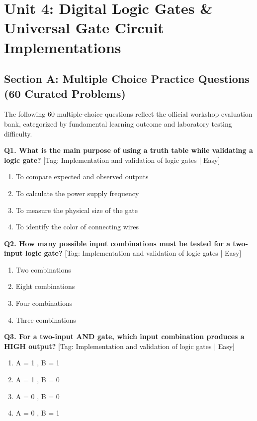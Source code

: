 \chapter{Unit 4: Digital Logic Gates \& Universal Gate Circuit Implementations}

\section{Section A: Multiple Choice Practice Questions (60 Curated Problems)}

\noindent The following 60 multiple-choice questions reflect the official workshop evaluation bank, categorized by fundamental learning outcome and laboratory testing difficulty.\vspace{3mm}

\noindent\textbf{Q1. What is the main purpose of using a truth table while validating a logic gate?} \hfill [Tag: Implementation and validation of logic gates | Easy]
\begin{enumerate}[label=(\alph*),topsep=2pt,itemsep=1pt,partopsep=0pt,parsep=0pt]
    \item {To compare expected and observed outputs}
    \item {To calculate the power supply frequency}
    \item {To measure the physical size of the gate}
    \item {To identify the color of connecting wires}
\end{enumerate}
\vspace{2mm}

\noindent\textbf{Q2. How many possible input combinations must be tested for a two-input logic gate?} \hfill [Tag: Implementation and validation of logic gates | Easy]
\begin{enumerate}[label=(\alph*),topsep=2pt,itemsep=1pt,partopsep=0pt,parsep=0pt]
    \item {Two combinations}
    \item {Eight combinations}
    \item {Four combinations}
    \item {Three combinations}
\end{enumerate}
\vspace{2mm}

\noindent\textbf{Q3. For a two-input AND gate, which input combination produces a HIGH output?} \hfill [Tag: Implementation and validation of logic gates | Easy]
\begin{enumerate}[label=(\alph*),topsep=2pt,itemsep=1pt,partopsep=0pt,parsep=0pt]
    \item {A = 1 , B = 1}
    \item {A = 1 , B = 0}
    \item {A = 0 , B = 0}
    \item {A = 0 , B = 1}
\end{enumerate}
\vspace{2mm}

